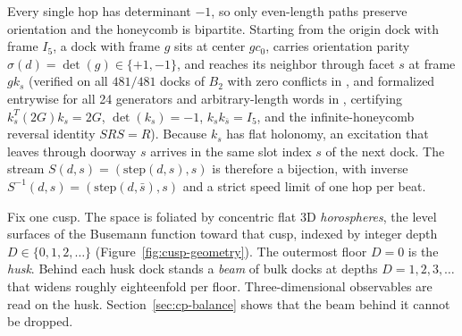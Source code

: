 Every single hop has determinant $-1$, so only even-length paths preserve orientation and the honeycomb is bipartite.
Starting from the origin dock with frame $I_5$, a dock with frame $g$ sits at center $g c_0$, carries orientation
parity $\sigma(d) = \det(g) \in \{+1, -1\}$, and reaches its neighbor through facet $s$ at frame $g k_s$ (verified on
all $481/481$ docks of $B_2$ with zero conflicts in \universecode, and formalized entrywise for all 24 generators and
arbitrary-length words in , certifying $k_s^T (2G) k_s = 2G$, $\det(k_s) = -1$,
$k_s k_{\bar{s}} = I_5$, and the infinite-honeycomb reversal identity $S R S = R$). Because $k_s$ has flat holonomy, an
excitation that leaves through doorway $s$ arrives in the same slot index $s$ of the next dock. The stream
$S(d, s) = (\mathrm{step}(d, s), s)$ is therefore a bijection, with inverse $S^{-1}(d, s) = (\mathrm{step}(d, \bar{s}), s)$
and a strict speed limit of one hop per beat.

Fix one cusp. The space is foliated by concentric flat 3D \emph{horospheres}, the
level surfaces of the Busemann function toward that cusp, indexed by integer depth $D \in \{0, 1, 2, \ldots\}$
(Figure~\ref{fig:cusp-geometry}). The outermost floor $D = 0$ is the \emph{husk}. Behind each husk dock stands a
\emph{beam} of bulk docks at depths $D = 1, 2, 3, \ldots$ that widens roughly eighteenfold per floor. Three-dimensional
observables are read on the husk. Section~\ref{sec:cp-balance} shows that the beam behind it cannot be dropped.

